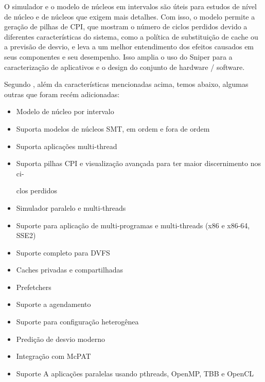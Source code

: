 \documentclass[12pt]{article}
\begin{document}
O simulador e o modelo de núcleos em intervalos são úteis para estudos de nível de núcleo e de núcleos que exigem mais detalhes. Com isso, o modelo permite a geração de pilhas de CPI, que mostram o número de ciclos perdidos devido a diferentes características do sistema, como a política de substituição de cache ou a previsão de desvio, e leva a um melhor entendimento dos efeitos causados em seus componentes e seu desempenho. Isso amplia o uso do Sniper para a caracterização de aplicativos e o design do conjunto de hardware / software.

Segundo \cite{sniper}, além da características mencionadas acima, temos abaixo, algumas outras que foram recém adicionadas:
\begin{itemize}
    \item Modelo de núcleo por intervalo
    \item Suporta modelos de núcleos SMT, em ordem e fora de ordem
    \item Suporta aplicações multi-thread
    \item Suporta pilhas CPI e visualização avançada para ter maior discernimento nos ci-
    
    clos perdidos
    \item Simulador paralelo e multi-threads
    \item Suporte para aplicação de multi-programas e multi-threads (x86 e x86-64, SSE2) 
    \item Suporte completo para DVFS
    \item Caches privadas e compartilhadas
    \item Prefetchers
    \item Suporte a agendamento
    \item Suporte para configuração heterogênea
    \item Predição de desvio moderno
    \item Integração com McPAT
    \item Suporte A aplicações paralelas usando pthreads, OpenMP, TBB e OpenCL
\end{itemize}
\end{document}
